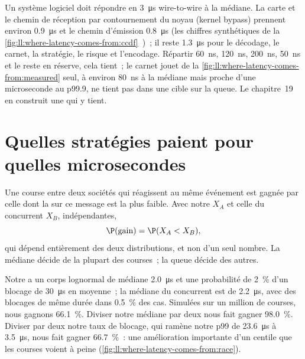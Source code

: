 \begin{example}\label{ex:ll:where-latency-comes-from:budget}
Un système logiciel doit répondre en \qty{3}{\micro\second} wire-to-wire à la médiane. La carte et le chemin de réception
par contournement du noyau (kernel bypass) prennent environ \qty{0.9}{\micro\second} et le chemin d'émission \qty{0.8}{\micro\second} (les
chiffres synthétiques de la \cref{fig:ll:where-latency-comes-from:ccdf}~)~; il reste \qty{1.3}{\micro\second} pour le décodage, le carnet, la stratégie,
le risque et l'encodage. Répartir \qty{60}{\nano\second}, \qty{120}{\nano\second}, \qty{200}{\nano\second},
\qty{50}{\nano\second} et le reste en réserve, cela tient~; le carnet jouet de la \cref{fig:ll:where-latency-comes-from:measured}
seul, à environ \qty{80}{\nano\second} à la médiane mais proche d'une microseconde au p99.9, ne tient pas
dans une cible sur la queue. Le chapitre~19 en construit une qui y tient.
\end{example}

\section{Quelles stratégies paient pour quelles microsecondes}

Une course entre deux sociétés qui réagissent au même événement est gagnée par celle dont la  sur ce message est la plus faible. Avec
notre  $X_A$ et celle du concurrent $X_B$, indépendantes,
\[
\P(\text{gain}) = \P(X_A < X_B),
\]
qui dépend entièrement des deux distributions, et non d'un seul nombre. La médiane décide de la plupart des courses~; la queue
décide des autres.

\begin{example}\label{ex:ll:where-latency-comes-from:race}
Notre  a un corps lognormal de médiane \qty{2.0}{\micro\second} et une probabilité de 2~\% d'un blocage de
\qty{30}{\micro\second} en moyenne~; la médiane du concurrent est de \qty{2.2}{\micro\second}, avec des blocages de même
durée dans 0.5~\% des cas. Simulées sur un million de courses, nous gagnons 66.1~\%. Diviser notre médiane par deux nous fait gagner 98.0~\%. Diviser par deux notre
taux de blocage, qui ramène notre p99 de \qty{23.6}{\micro\second} à \qty{3.5}{\micro\second}, nous fait gagner 66.7~\%~: une amélioration importante
d'un centile que les courses voient à peine (\cref{fig:ll:where-latency-comes-from:race}).
\end{example}

